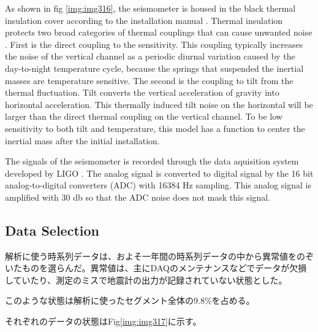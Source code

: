 As shown in fig \ref{img:img316}, the seismometer is housed in the black thermal insulation cover according to the installation manual \cite{trillium120manual}. Thermal insulation protects two broad categories of thermal couplings that can cause unwanted noise \cite{trillium120manual}. First is the direct coupling to the sensitivity. This coupling typically increases the noise of the vertical channel as a periodic diurnal variation caused by the day-to-night temperature cycle, because the springs that suspended the inertial masses are temperature sensitive. The second is the coupling to tilt from the thermal fluctuation. Tilt converts the vertical acceleration of gravity into horizontal acceleration. This thermally induced tilt noise on the horizontal will be larger than the direct thermal coupling on the vertical channel. To be low sensitivity to both tilt and temperature, this model has a function to center the inertial mass after the initial installation.

The signals of the seismometer is recorded through the data aquisition system developed by LIGO \cite{bork2001overview}. The analog signal is converted to digital signal by the 16 bit analog-to-digital converters (ADC) with 16384 $\mathrm{Hz}$ sampling. This analog signal is amplified with 30 db so that the ADC noise does not mask this signal. 



\subsection{Data Selection}
解析に使う時系列データは、およそ一年間の時系列データの中から異常値をのぞいたものを選らんだ。異常値は、主にDAQのメンテナンスなどでデータが欠損していたり、測定のミスで地震計の出力が記録されていない状態とした。

このような状態は解析に使ったセグメント全体の9.8\%を占める。

それぞれのデータの状態はFig\ref{img:img317}に示す。

